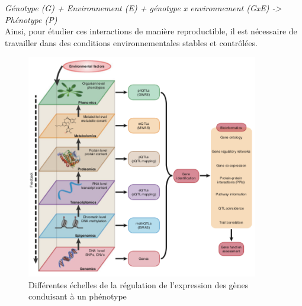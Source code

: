  \textit{Génotype (G) + Environnement (E) +  génotype x environnement (GxE) -> Phénotype (P)}\\
 
 Ainsi, pour étudier ces interactions de manière reproductible, il est nécessaire de travailler dans des conditions environnementales stables et contrôlées. 
 \\
 
\begin{figure}[!ht]
    \centering
    \includegraphics[width=0.9\textwidth]{hdr_manuscript/Figures/Geno-pheno.png}
    \caption{Différentes échelles de la régulation de l’expression  des gènes conduisant à un phénotype \cite{ChenCAK14}}
    \label{fig:geno-pheno}
\end{figure}

